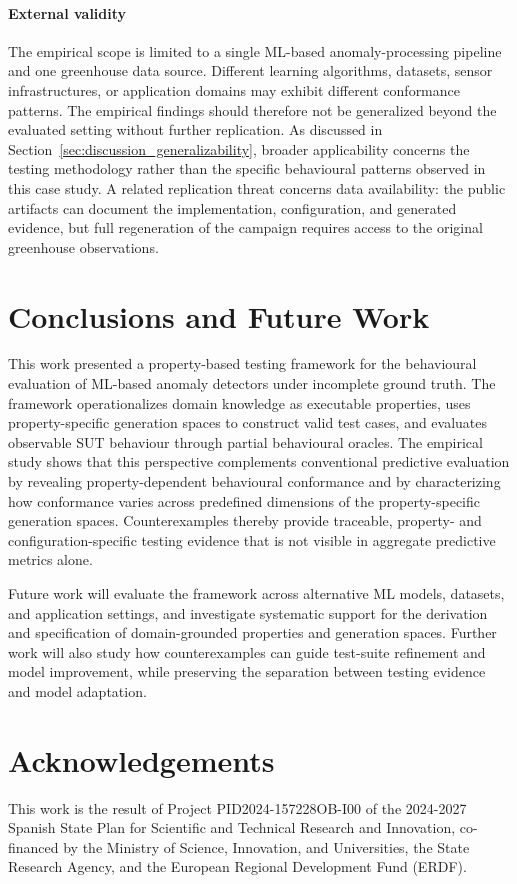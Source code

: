 \documentclass[preprint,12pt]{elsarticle}
\begin{document}
\paragraph{External validity}
The empirical scope is limited to a single ML-based anomaly-processing
pipeline and one greenhouse data source. Different learning algorithms,
datasets, sensor infrastructures, or application domains may exhibit
different conformance patterns. The empirical findings should therefore not
be generalized beyond the evaluated setting without further replication.
As discussed in Section~\ref{sec:discussion_generalizability}, broader
applicability concerns the testing methodology rather than the specific
behavioural patterns observed in this case study. A related replication
threat concerns data availability: the public artifacts can document the
implementation, configuration, and generated evidence, but full regeneration
of the campaign requires access to the original greenhouse observations.


\section{Conclusions and Future Work}
\label{sec:conclusions}

This work presented a property-based testing framework for the behavioural
evaluation of ML-based anomaly detectors under incomplete ground truth.
The framework operationalizes domain knowledge as executable properties,
uses property-specific generation spaces to construct valid test cases, and
evaluates observable SUT behaviour through partial behavioural oracles.
The empirical study shows that this perspective complements conventional
predictive evaluation by revealing property-dependent behavioural conformance
and by characterizing how conformance varies across predefined dimensions of
the property-specific generation spaces. Counterexamples thereby provide
traceable, property- and configuration-specific testing evidence that is not
visible in aggregate predictive metrics alone.

Future work will evaluate the framework across alternative ML models,
datasets, and application settings, and investigate systematic support for
the derivation and specification of domain-grounded properties and generation
spaces. Further work will also study how counterexamples can guide test-suite
refinement and model improvement, while preserving the separation between
testing evidence and model adaptation.

\section*{Acknowledgements}
This work is the result of Project PID2024-157228OB-I00 of the 2024-2027 Spanish State Plan for Scientific and Technical Research and Innovation, co-financed by the Ministry of Science, Innovation, and Universities, the State Research Agency, and the European Regional Development Fund (ERDF).



\end{document}
